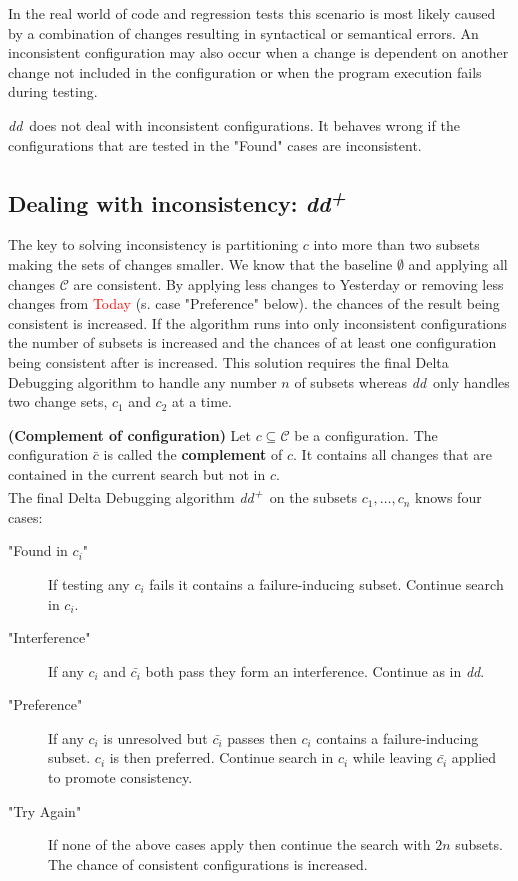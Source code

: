 \documentclass[a4paper,UKenglish]{lipics-v2018}
\newcommand{\dd}[0]{\textit{dd}}
\newcommand{\ddp}{\textit{dd\textsuperscript{+}}}
\newcommand{\green}[1]{\textcolor{td-green}{#1}}
\newcommand{\red}[1]{\textcolor{red}{#1}}
\newcommand{\yd}[0]{\green{Yesterday} }
\newcommand{\td}[0]{\red{Today} }
\newcommand{\C}[0]{\ensuremath{\mathcal{C}}}
\newcommand{\defsub}[1]{\textbf{(#1)} }
\begin{document}
In the real world of code and regression tests this scenario is most likely caused by a combination of changes resulting in syntactical or semantical errors. An inconsistent configuration may also occur when a change is dependent on another change not included in the configuration or when the program execution fails during testing. 

\dd\ does not deal with inconsistent configurations. It behaves wrong if the configurations that are tested in the "Found" cases are inconsistent.


\subsection{Dealing with inconsistency: \ddp}

The key to solving inconsistency is partitioning $c$ into more than two subsets making the sets of changes smaller. We know that the baseline $\emptyset$ and applying all changes $\C$ are consistent. By applying less changes to \yd or removing less changes from \td (s. case "Preference" below). the chances of the result being consistent is increased. If the algorithm runs into only inconsistent configurations the number of subsets is increased and the chances of at least one configuration being consistent after is increased. This solution requires the final Delta Debugging algorithm to handle any number $n$ of subsets whereas \dd\ only handles two change sets, $c_1$ and $c_2$ at a time.

 \defsub{Complement of configuration} Let $c \subseteq \C$ be a configuration. The configuration $\bar{c}$ is called the \textbf{complement} of $c$. It contains all changes that are contained in the current search but not in $c$.\\

The final Delta Debugging algorithm \ddp\ on the subsets $c_1, \dots, c_n$ knows four cases:\\
\begin{description}
	\item["Found in $c_i$"] If testing any $c_i$ fails it contains a failure-inducing subset. Continue search in $c_i$.
	\item["Interference"] If any $c_i$ and $\bar{c_i}$ both pass they form an interference. Continue as in \dd.
	\item["Preference"] If any $c_i$ is unresolved but $\bar{c_i}$ passes then $c_i$ contains a failure-inducing subset. $c_i$ is then preferred. Continue search in $c_i$ while leaving $\bar{c_i}$ applied to promote consistency.
	\item["Try Again"] If none of the above cases apply then continue the search with $2n$ subsets. The chance of consistent configurations is increased.
\end{description}
\end{document}
